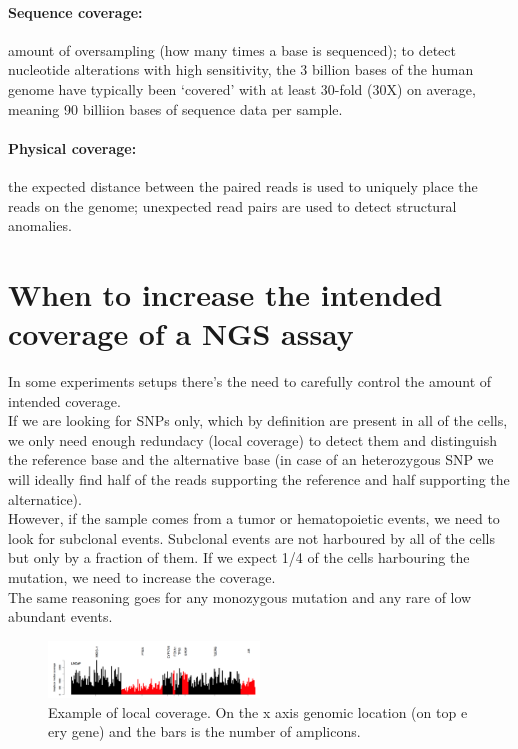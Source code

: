 \paragraph{Sequence coverage:}
		amount of oversampling (how many times a base is sequenced); to detect nucleotide alterations with high sensitivity, the 3 billion bases of the human genome have typically been ‘covered’ with at least 30-fold (30X) on average, meaning 90 billiion bases of sequence data per sample. 
	\paragraph{Physical coverage:}
		the expected distance between the paired reads is used to uniquely place the reads on the genome; unexpected read pairs are used to detect structural anomalies.

\section{When to increase the intended coverage of a NGS assay}
In some experiments setups there's the need to carefully control the amount of intended coverage. \\
If we are looking for SNPs only, which by definition are present in all of the cells, we only need enough redundacy (local coverage) to detect them and distinguish the reference base and the alternative base (in case of an heterozygous SNP we will ideally find half of the reads supporting the reference and half supporting the alternatice).\\
However, if the sample comes from a tumor or hematopoietic events, we need to look for subclonal events. Subclonal events are not harboured by all of the cells but only by a fraction of them. If we expect 1/4 of the cells harbouring the mutation, we need to increase the coverage. \\
The same reasoning goes for any monozygous mutation and any rare of low abundant events. 

\begin{figure}[htbp!]
    \centering
    \includegraphics[width=0.5\textwidth]{local_coverage.png}
    \caption{Example of local coverage. On the x axis genomic location (on top e ery gene) and the bars is the number of amplicons. }
    \label{fig:local}
\end{figure}

